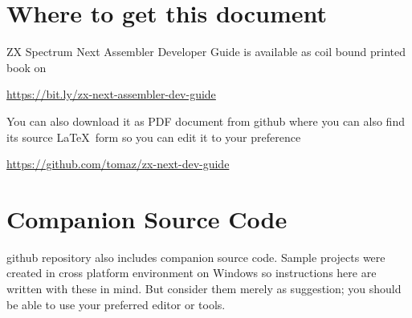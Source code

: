\documentclass[12pt,twoside,openright,a4paper]{book}
\begin{document}
\minitoc


\section{Where to get this document}

ZX Spectrum Next Assembler Developer Guide is available as coil bound printed book on

\url{https://bit.ly/zx-next-assembler-dev-guide}

You can also download it as PDF document from github where you can also find its source \LaTeX ~form so you can edit it to your preference

\url{https://github.com/tomaz/zx-next-dev-guide}


\section{Companion Source Code}

github repository also includes companion source code. Sample projects were created in cross platform environment on Windows so instructions here are written with these in mind. But consider them merely as suggestion; you should be able to use your preferred editor or tools.
\end{document}
